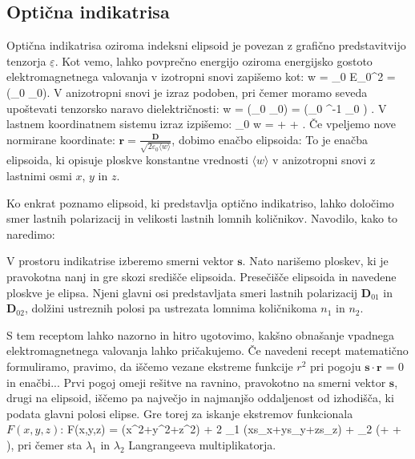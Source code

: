 \subsection*{Optična indikatrisa}
Optična indikatrisa oziroma indeksni elipsoid je povezan z grafično predstavitvijo
tenzorja $\underline{\varepsilon}$. Kot vemo, lahko povprečno energijo oziroma
energijsko gostoto elektromagnetnega valovanja v izotropni snovi zapišemo kot:
\beq
\langle w \rangle =  \varepsilon \varepsilon_0 E_0^2 =  
\left(_0 \cdot {}_0\right). 
\eeq
V anizotropni snovi je izraz podoben, pri čemer moramo seveda upoštevati
tenzorsko naravo dielektričnosti:
\beq
\langle w \rangle =  \left(_0 \cdot {}_0\right) = 
\left(_0 \cdot \underline{\varepsilon}^{-1} \cdot {}_0
\right) .
\eeq
V lastnem koordinatnem sistemu izraz izpišemo:
 \varepsilon_0 \langle w \rangle =  + 
 + .
\eeq
Če vpeljemo nove normirane koordinate:
$\mathbf{r} = \frac{\mathbf{D}}{\sqrt{2 \varepsilon_0 \langle w\rangle}}$, 
dobimo enačbo elipsoida:
To je enačba elipsoida, ki opisuje ploskve konstantne vrednosti $\langle w \rangle$ 
v anizotropni snovi z lastnimi osmi $x$, $y$ in $z$. 

Ko enkrat poznamo elipsoid, ki predstavlja optično indikatriso, 
lahko določimo smer lastnih polarizacij in velikosti lastnih 
lomnih količnikov. Navodilo, kako to naredimo:
 
V prostoru indikatrise izberemo smerni vektor $\mathbf{s}$. Nato 
narišemo ploskev, ki je pravokotna nanj in gre skozi središče elipsoida. 
Presečišče elipsoida in navedene ploskve je elipsa. Njeni glavni osi
predstavljata smeri lastnih polarizacij $\mathbf{D}_{01}$ in $\mathbf{D}_{02}$,
dolžini ustreznih polosi pa ustrezata lomnima količnikoma $n_1$ in $n_2$. 

S tem receptom lahko nazorno in hitro ugotovimo, kakšno obnašanje
vpadnega elektromagnetnega valovanja lahko pričakujemo.  Če navedeni
recept matematično formuliramo, pravimo, da iščemo vezane ekstreme funkcije $r^2$
pri pogoju $\mathbf{s}\cdot \mathbf{r}$ = 0 in enačbi... Prvi pogoj omeji 
rešitve na ravnino, pravokotno na smerni vektor $\mathbf{s}$, drugi na elipsoid, 
iščemo pa največjo in najmanjšo 
oddaljenost od izhodišča, ki podata glavni polosi elipse. Gre torej za
iskanje ekstremov funkcionala $F(x,y,z)$:
\beq
F(x,y,z) = (x^2+y^2+z^2) + 2 \lambda_1 (xs_x+ys_y+zs_z) + \lambda_2
\left(+ +
 \right),
\eeq
pri čemer sta $\lambda_1$ in $\lambda_2$ Langrangeeva multiplikatorja.

